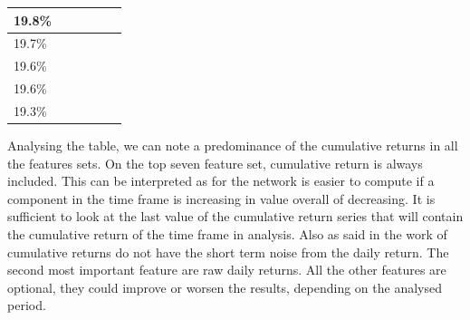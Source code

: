 \begin{table}[h]
{\begin{tabular}{|l|l|l|l|l|l|}
			19.8\%                                                                        & \cellcolor[HTML]{9AFF99}                        & \cellcolor[HTML]{9AFF99}                                                                & \cellcolor[HTML]{FFCCC9}                                               & \cellcolor[HTML]{9AFF99}                                     & \cellcolor[HTML]{9AFF99}{\color[HTML]{9AFF99} } \\ \hline
			19.7\%                                                                        & \cellcolor[HTML]{FFCCC9}                        & \cellcolor[HTML]{9AFF99}                                                                & \cellcolor[HTML]{9AFF99}                                               & \cellcolor[HTML]{9AFF99}                                     & \cellcolor[HTML]{FFCCC9}{\color[HTML]{FFCCC9} } \\ \hline
			19.6\%                                                                        & \cellcolor[HTML]{FFCCC9}                        & \cellcolor[HTML]{9AFF99}                                                                & \cellcolor[HTML]{FFCCC9}                                               & \cellcolor[HTML]{9AFF99}                                     & \cellcolor[HTML]{FFCCC9}{\color[HTML]{FFCCC9} } \\ \hline
			19.6\%                                                                        & \cellcolor[HTML]{FFCCC9}                        & \cellcolor[HTML]{FFCCC9}                                                                & \cellcolor[HTML]{9AFF99}                                               & \cellcolor[HTML]{9AFF99}                                     & \cellcolor[HTML]{FFCCC9}{\color[HTML]{FFCCC9} } \\ \hline
			19.3\%                                                                        & \cellcolor[HTML]{9AFF99}                        & \cellcolor[HTML]{9AFF99}                                                                & \cellcolor[HTML]{9AFF99}                                               & \cellcolor[HTML]{9AFF99}                                     & \cellcolor[HTML]{FFCCC9}{\color[HTML]{FFCCC9} } \\ \hline
		\end{tabular}%
	}
\end{table}

Analysing the table, we can note a predominance of the cumulative returns in all the features sets. On the top seven feature set, cumulative return is always included. This can be interpreted as for the network is easier to compute if a component in the time frame is increasing in value overall of decreasing. It is sufficient to look at the last value of the cumulative return series that will contain the cumulative return of the time frame in analysis. Also as said in the work of \cite{chakravorty2018deep} cumulative returns do not have the short term noise from the daily return. The second most important feature are raw daily returns. All the other features are optional, they could improve or worsen the results, depending on the analysed period. 

